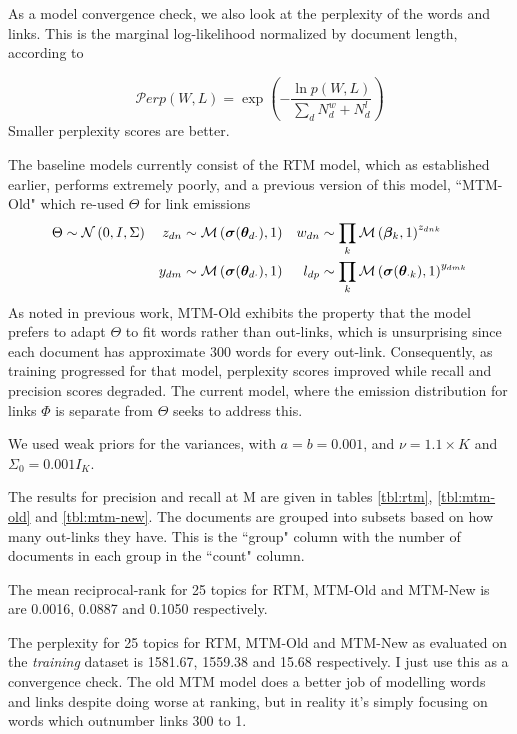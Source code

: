 As a model convergence check, we also look at the perplexity of the words and links. This is the marginal log-likelihood normalized by document length, according to 

\begin{equation}
\mathcal{P}erp(W,L) = \exp\left( - \frac{\ln p(W,L)}{\sum_d N^w_d + N^l_d} \right)
\end{equation}
Smaller perplexity scores are better.


The baseline models currently consist of the RTM model, which as established earlier, performs extremely poorly, and a previous version of this model, ``MTM-Old" which re-used $\Theta$ for link emissions
\begin{align}
\Theta & \sim \mathcal{N} \left(0, I, \Sigma\right) &
z_{dn} & \sim \mathcal{M} \left( {\bm \sigma({ \bm \theta_{d\cdot} })},{1} \right) &
w_{dn} & \sim \prod_k \mathcal{M} \left( {\bm \beta_k},{1} \right)^{z_{dnk}} \\
& &
y_{dm} & \sim \mathcal{M} \left( {\bm \sigma({ \bm \theta_{d\cdot} })},{1} \right) &
l_{dp} & \sim \prod_k \mathcal{M} \left( {\bm \sigma({ \bm \theta_{\cdot k} })},{1} \right)^{y_{dmk}}
\end{align}
As noted in previous work, MTM-Old exhibits the property that the model prefers to adapt $\Theta$ to fit words rather than out-links, which is unsurprising since each document has approximate 300 words for every out-link. Consequently, as training progressed for that model, perplexity scores improved while recall and precision scores degraded. The current model, where the emission distribution for links $\Phi$ is separate from $\Theta$ seeks to address this.

We used weak priors for the variances, with $a = b = 0.001$, and $\nu = 1.1 \times K$ and $\Sigma_0 = 0.001 I_K$.

The results for precision and recall at M are given in tables \ref{tbl:rtm}, \ref{tbl:mtm-old} and \ref{tbl:mtm-new}. The documents are grouped into subsets based on how many out-links they have. This is the ``group" column with the number of documents in each group in the ``count" column.

The mean reciprocal-rank for 25 topics for RTM, MTM-Old and MTM-New is are 0.0016, 0.0887 and 0.1050 respectively.

The perplexity for 25 topics for RTM, MTM-Old and MTM-New as evaluated on the \emph{training} dataset is 1581.67, 1559.38 and 15.68 respectively. I just use this as a convergence check. The old MTM model does a better job of modelling words and links despite doing worse at ranking, but in reality it's simply focusing on words which outnumber links 300 to 1.

